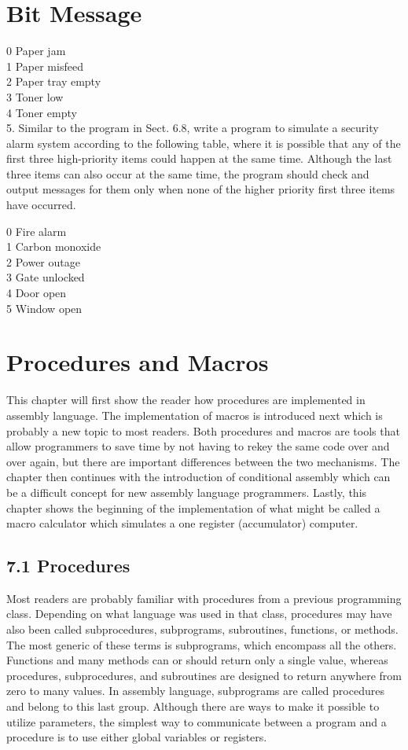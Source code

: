 \documentclass[10pt]{book}
\begin{document}
\begin{center}
\begin{center}
\section*{Bit Message}
0 Paper jam\\
1 Paper misfeed\\
2 Paper tray empty\\
3 Toner low\\
4 Toner empty\\
5. Similar to the program in Sect. 6.8, write a program to simulate a security alarm system according to the following table, where it is possible that any of the first three high-priority items could happen at the same time. Although the last three items can also occur at the same time, the program should check and output messages for them only when none of the higher priority first three items have occurred.

0 Fire alarm\\
1 Carbon monoxide\\
2 Power outage\\
3 Gate unlocked\\
4 Door open\\
5 Window open

\section*{Procedures and Macros}
This chapter will first show the reader how procedures are implemented in assembly language. The implementation of macros is introduced next which is probably a new topic to most readers. Both procedures and macros are tools that allow programmers to save time by not having to rekey the same code over and over again, but there are important differences between the two mechanisms. The chapter then continues with the introduction of conditional assembly which can be a difficult concept for new assembly language programmers. Lastly, this chapter shows the beginning of the implementation of what might be called a macro calculator which simulates a one register (accumulator) computer.

\subsection*{7.1 Procedures}
Most readers are probably familiar with procedures from a previous programming class. Depending on what language was used in that class, procedures may have also been called subprocedures, subprograms, subroutines, functions, or methods. The most generic of these terms is subprograms, which encompass all the others. Functions and many methods can or should return only a single value, whereas procedures, subprocedures, and subroutines are designed to return anywhere from zero to many values. In assembly language, subprograms are called procedures and belong to this last group. Although there are ways to make it possible to utilize parameters, the simplest way to communicate between a program and a procedure is to use either global variables or registers.


\end{center}
\end{center}
\end{document}
